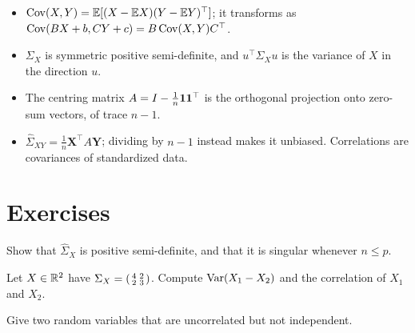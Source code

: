 \begin{notechapter}
\begin{chaptersummary}
\begin{itemize}[nosep]
  \item $\operatorname{Cov}(X,Y) = \mathbb{E}[(X-\mathbb{E} X)(Y-\mathbb{E} Y)^\top]$; it transforms as
        $\operatorname{Cov}(BX+b, CY+c) = B\operatorname{Cov}(X,Y)C^\top$.
  \item $\Sigma_X$ is symmetric positive semi-definite, and $u^\top\Sigma_Xu$ is
        the variance of $X$ in the direction $u$.
  \item The centring matrix $A = I - \frac1n\mathbf{1}\mathbf{1}^\top$ is the orthogonal
        projection onto zero-sum vectors, of trace $n-1$.
  \item $\hat\Sigma_{XY} = \frac1n\mathbf X^\top A\mathbf Y$; dividing by $n-1$
        instead makes it unbiased. Correlations are covariances of standardized
        data.
\end{itemize}
\end{chaptersummary}

\section*{Exercises}

\begin{exercise}\label{covariance-estimation:exr:1}
Show that $\hat\Sigma_X$ is positive semi-definite, and that it is singular
whenever $n\leq p$.
\end{exercise}

\begin{exercise}\label{covariance-estimation:exr:2}
Let $X\in\mathbb{R}^2$ have $\Sigma_X = \begin{psmallmatrix}4&2\\2&3\end{psmallmatrix}$.
Compute $\operatorname{Var}(X_1 - X_2)$ and the correlation of $X_1$ and $X_2$.
\end{exercise}

\begin{exercise}\label{covariance-estimation:exr:3}
Give two random variables that are uncorrelated but not independent.
\end{exercise}
\end{notechapter}
